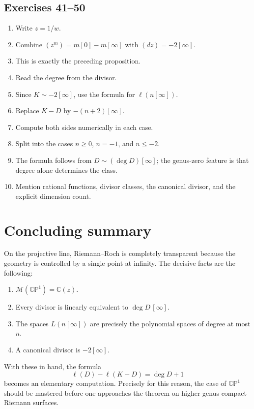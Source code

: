 \documentclass[11pt]{article}
\newcommand{\C}{\mathbb{C}}
\newcommand{\CP}{\mathbb{CP}}
\newcommand{\MM}{\mathcal{M}}
\newcommand{\degd}{\operatorname{deg}}
\newcommand{\CPone}{\CP^1}
\newcommand{\ellD}{\ell}
\theoremstyle{plain}
\theoremstyle{definition}
\begin{document}
\subsection*{Exercises 41--50}
\begin{enumerate}[label=\textbf{\arabic*.}, start=41]
    \item Write $z=1/w$.
    \item Combine $(z^m)=m[0]-m[\infty]$ with $(dz)=-2[\infty]$.
    \item This is exactly the preceding proposition.
    \item Read the degree from the divisor.
    \item Since $K\sim -2[\infty]$, use the formula for $\ellD(n[\infty])$.
    \item Replace $K-D$ by $-(n+2)[\infty]$.
    \item Compute both sides numerically in each case.
    \item Split into the cases $n\ge 0$, $n=-1$, and $n\le -2$.
    \item The formula follows from $D\sim (\degd D)[\infty]$; the genus-zero feature is that degree alone determines the class.
    \item Mention rational functions, divisor classes, the canonical divisor, and the explicit dimension count.
\end{enumerate}

\section{Concluding summary}
On the projective line, Riemann--Roch is completely transparent because the geometry is controlled by a single point at infinity. The decisive facts are the following:
\begin{enumerate}
    \item $\MM(\CPone)=\C(z)$.
    \item Every divisor is linearly equivalent to $\degd D\,[\infty]$.
    \item The spaces $L(n[\infty])$ are precisely the polynomial spaces of degree at most $n$.
    \item A canonical divisor is $-2[\infty]$.
\end{enumerate}
With these in hand, the formula
\[
\ellD(D)-\ellD(K-D)=\degd D+1
\]
becomes an elementary computation. Precisely for this reason, the case of $\CPone$ should be mastered before one approaches the theorem on higher-genus compact Riemann surfaces.
\end{document}
